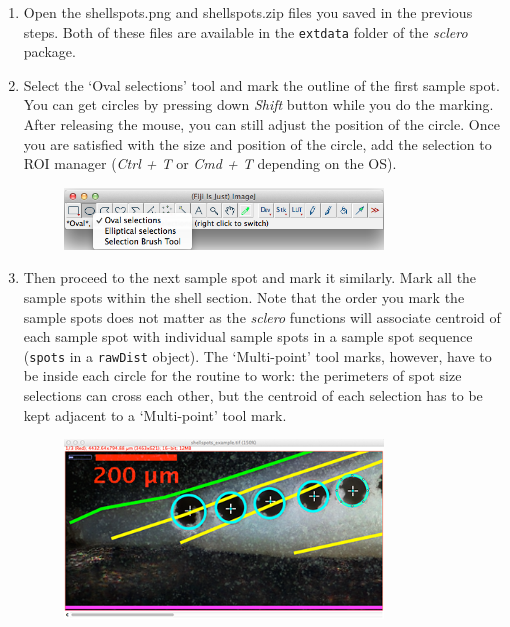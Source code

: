 \documentclass[11pt, a4paper]{article}
\newcommand{\sclero}{\textit{sclero}\xspace}
\begin{document}
\begin{enumerate}
\item Open the shellspots.png and shellspots.zip files you saved in the previous steps. Both of these files are available in the \texttt{extdata} folder of the \sclero package. 
\item Select the `Oval selections' tool and mark the outline of the first sample spot. You can get circles by pressing down \textit{Shift} button while you do the marking. After releasing the mouse, you can still adjust the position of the circle. Once you are satisfied with the size and position of the circle, add the selection to ROI manager (\textit{Ctrl + T} or \textit{Cmd + T} depending on the OS).
\begin{figure}[H]
\begin{center}
\includegraphics[width = 0.8\textwidth]{oval_selection.png}
\end{center}
\end{figure}
\item Then proceed to the next sample spot and mark it similarly. Mark all the sample spots within the shell section. Note that the order you mark the sample spots does not matter as the \sclero functions will associate centroid of each sample spot with individual sample spots in a sample spot sequence (\texttt{spots} in a \texttt{rawDist} object). The `Multi-point' tool marks, however, have to be inside each circle for the routine to work: the perimeters of spot size selections can cross each other, but the centroid of each selection has to be kept adjacent to a `Multi-point' tool mark.
\begin{figure}[H]
\begin{center}
\includegraphics[width = 0.8\textwidth]{adding_ovals.png}

\end{center}
\end{figure}
\end{enumerate}
\end{document}
